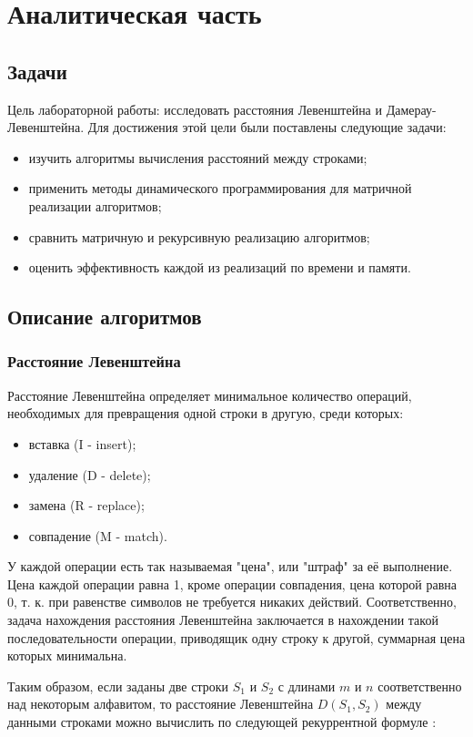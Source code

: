 \documentclass[14pt, a4paper]{report}
\begin{document}
    \chapter{Аналитическая часть}

	\section{Задачи}
	Цель лабораторной работы: исследовать расстояния Левенштейна и Дамерау-Левенштейна. Для достижения этой цели были поставлены следующие задачи: 
	\begin{itemize}
		\item изучить алгоритмы вычисления расстояний между строками;
		\item применить методы динамического программирования для матричной реализации алгоритмов;
		\item сравнить матричную и рекурсивную реализацию алгоритмов;
		\item оценить эффективность каждой из реализаций по времени и памяти.
	\end{itemize}

	\section{Описание алгоритмов}
	\subsection{Расстояние Левенштейна}
	Расстояние Левенштейна определяет минимальное количество операций, необходимых для превращения одной строки в другую, среди которых:
	\begin{itemize}
		\item вставка (I - insert);
		\item удаление (D - delete);
		\item замена (R - replace);
		\item совпадение (M - match).
	\end{itemize}
	У каждой операции есть так называемая "цена", или "штраф" за её выполнение. Цена каждой операции равна 1, кроме операции совпадения, цена которой равна 0, т. к. при равенстве символов не требуется никаких действий. Соответственно, задача нахождения расстояния Левенштейна заключается в нахождении такой последовательности операции, приводящик одну строку к другой, суммарная цена которых минимальна.

	Таким образом, если заданы две строки $S_{1}$ и $S_{2}$ с длинами $m$ и $n$ соответственно над некоторым алфавитом, то расстояние Левенштейна $D(S_{1}, S_{2})$ между данными строками можно вычислить по следующей рекуррентной формуле \cite{recurs}:
\end{document}
